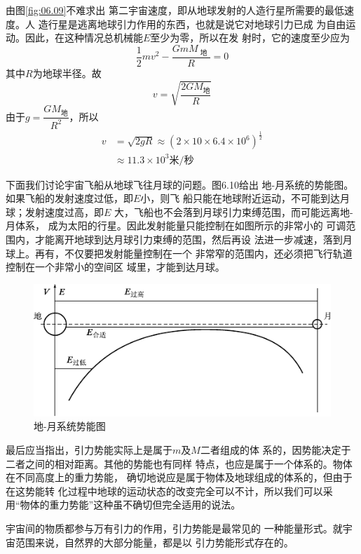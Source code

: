由图\ref{fig:06.09}不难求出
第二宇宙速度，即从地球发射的人造行星所需要的最低速度。人
造行星是逃离地球引力作用的东西，也就是说它对地球引力已成
为自由运动。因此，在这种情况总机械能$ E $至少为零，所以在发
射时，它的速度至少应为
\begin{equation*}
  \frac { 1 } { 2 } m v ^ { 2 } - \frac { G m M _ \text { 地 } } { R } = 0
\end{equation*}
其中$ R $为地球半径。故
\begin{equation*}
  v = \sqrt{\frac { 2 G M _ \text{地} } { R } }
\end{equation*}
由于$ g = \dfrac { G M _ \text{地} } { R ^ { 2 } } $，所以
\clearpage
\begin{equation*}
  \begin{aligned}
    v & = \sqrt { 2 g R } \approx \left( 2 \times 10 \times 6.4 \times 10 ^ { 6 } \right) ^ { \frac { 1 } { 2 } } \\
      & \approx 11.3 \times 10 ^ { 3 } \text{米/秒}
  \end{aligned}
\end{equation*}

下面我们讨论宇宙飞船从地球飞往月球的问题。图6.10给出
地-月系统的势能图。如果飞船的发射速度过低，即$ E $小，则飞
船只能在地球附近运动，不可能到达月球；发射速度过高，即$ E $
大，飞船也不会落到月球引力束缚范围，而可能远离地-月体系，
成为太阳的行星。因此发射能量只能控制在如图所示的非常小的
可调范围内，才能离开地球到达月球引力束缚的范围，然后再设
法进一步减速，落到月球上。再有，不仅要把发射能量控制在一个
非常窄的范围内，还必须把飞行轨道控制在一个非常小的空间区
域里，才能到达月球。

\begin{figure}[h]
  \centering
  \includegraphics{figure/fig06.10}
  \caption{地-月系统势能图}
  \label{fig:06.10}
  \vspace{-0.8em}
\end{figure}

最后应当指出，引力势能实际上是属于$ m $及$ M $二者组成的体
系的，因势能决定于二者之间的相对距离。其他的势能也有同样
特点，也应是属于一个体系的。物体在不同高度上的重力势能，
确切地说应是属于物体及地球组成的体系的，但由于在这势能转
化过程中地球的运动状态的改变完全可以不计，所以我们可以采
用“物体的重力势能”这种虽不确切但完全适用的说法。

宇宙间的物质都参与万有引力的作用，引力势能是最常见的
一种能量形式。就宇宙范围来说，自然界的大部分能量，都是以
引力势能形式存在的。